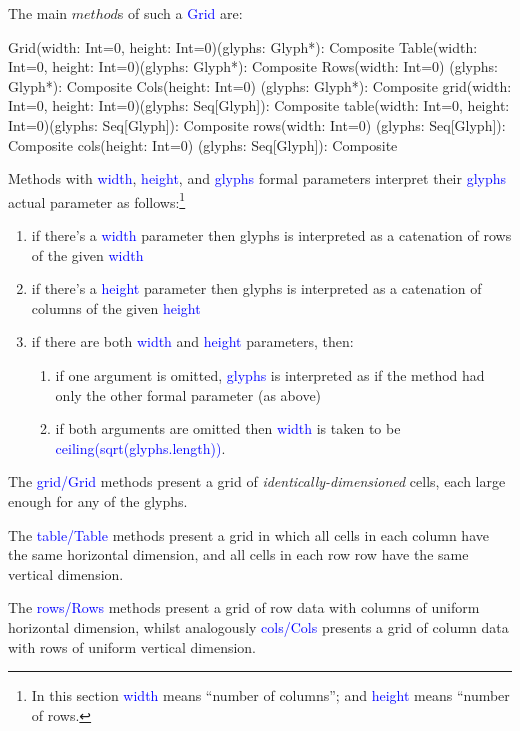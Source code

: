 \documentclass[12pt,a4paper]{article}
\def\Scala#1{\textcolor{blue}{\textsf{#1}}}
\begin{document}
The main $method$s of such a \Scala{Grid} are:
\begin{scala}
  Grid(width:  Int=0, height: Int=0)(glyphs: Glyph*):      Composite
  Table(width: Int=0, height: Int=0)(glyphs: Glyph*):      Composite
  Rows(width:  Int=0)                (glyphs: Glyph*):     Composite 
  Cols(height: Int=0)                (glyphs: Glyph*):     Composite 
  grid(width:  Int=0, height: Int=0)(glyphs: Seq[Glyph]):  Composite
  table(width: Int=0, height: Int=0)(glyphs: Seq[Glyph]):  Composite
  rows(width:  Int=0)                (glyphs: Seq[Glyph]): Composite
  cols(height: Int=0)                (glyphs: Seq[Glyph]): Composite
\end{scala}

Methods with \Scala{width}, \Scala{height}, and \Scala{glyphs} formal parameters interpret
their \Scala{glyphs} actual parameter as follows:\footnote{In this section \Scala{width} means ``number of columns''; and \Scala{height} means
``number of rows.}
\begin{enumerate}
     \item  if there's a \Scala{width} parameter then glyphs is interpreted as a catenation of rows of the given \Scala{width}
     \item if there's a \Scala{height} parameter then glyphs is interpreted as a catenation of columns of the given \Scala{height}
     \item if there are both \Scala{width} and \Scala{height} parameters, then:
    \begin{enumerate}
         \item if one argument is omitted,
         \Scala{glyphs} is interpreted as if the method had only the other formal parameter (as above)
         \item if  both arguments are omitted then \Scala{width} is taken to be \Scala{ceiling(sqrt(glyphs.length))}.
    \end{enumerate}
\end{enumerate}


The \Scala{grid/Grid} methods present a grid of
\textit{identically-dimensioned} cells,
each large enough for any of the glyphs.

The \Scala{table/Table} methods present a grid in which 
all cells in each column have the same horizontal dimension, and all cells in each row
row have the same vertical dimension.

The \Scala{rows/Rows} methods present a grid of row data with columns of uniform horizontal dimension, whilst
analogously  \Scala{cols/Cols} presents a grid of column data with rows of uniform vertical dimension.
\end{document}
